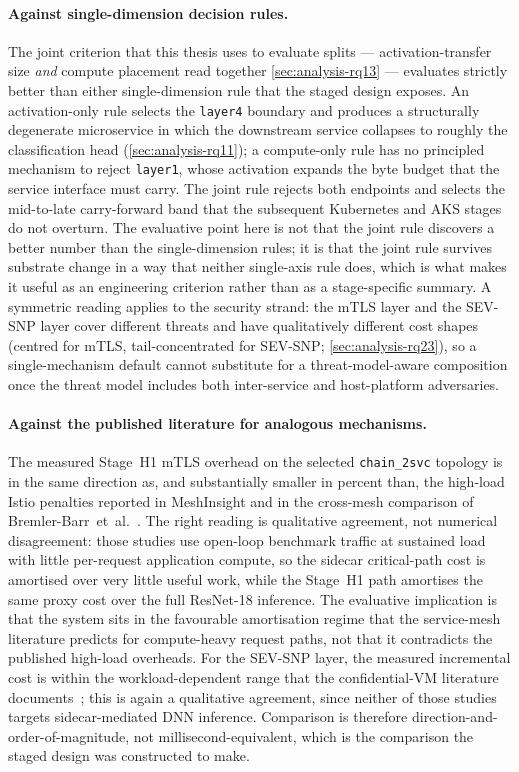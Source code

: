 \paragraph{Against single-dimension decision rules.}
The joint criterion that this thesis uses to evaluate splits ---
activation-transfer size \emph{and} compute placement read together
\cref{sec:analysis-rq13} --- evaluates strictly better than either
single-dimension rule that the staged design exposes. An
activation-only rule selects the \texttt{layer4} boundary and
produces a structurally degenerate microservice in which the
downstream service collapses to roughly the classification head
(\cref{sec:analysis-rq11}); a compute-only rule has no principled
mechanism to reject \texttt{layer1}, whose activation expands the
byte budget that the service interface must carry. The joint rule
rejects both endpoints and selects the mid-to-late carry-forward
band that the subsequent Kubernetes and AKS stages do not overturn.
The evaluative point here is not that the joint rule discovers a
better number than the single-dimension rules; it is that the joint
rule survives substrate change in a way that neither single-axis
rule does, which is what makes it useful as an engineering criterion
rather than as a stage-specific summary. A symmetric reading applies
to the security strand: the mTLS layer and the SEV-SNP layer cover
different threats and have qualitatively different cost shapes
(centred for mTLS, tail-concentrated for SEV-SNP;
\cref{sec:analysis-rq23}), so a single-mechanism default cannot
substitute for a threat-model-aware composition once the threat
model includes both inter-service and host-platform adversaries.

\paragraph{Against the published literature for analogous mechanisms.}
The measured Stage~H1 mTLS overhead on the selected
\texttt{chain\_2svc} topology is in the same direction as, and
substantially smaller in percent than, the high-load Istio penalties
reported in MeshInsight and in the cross-mesh comparison of
Bremler-Barr~et~al.~\cite{meshinsight_socc23,bremlerbarr2025mtls}.
The right reading is qualitative agreement, not numerical
disagreement: those studies use open-loop benchmark traffic at
sustained load with little per-request application compute, so the
sidecar critical-path cost is amortised over very little useful work,
while the Stage~H1 path amortises the same proxy cost over the full
ResNet-18 inference. The evaluative implication is that the system
sits in the favourable amortisation regime that the service-mesh
literature predicts for compute-heavy request paths, not that it
contradicts the published high-load overheads. For the SEV-SNP layer,
the measured incremental cost is within the workload-dependent range
that the confidential-VM literature
documents~\cite{misono2024_cvm_explained,akram2021_hpc_tees}; this is
again a qualitative agreement, since neither of those studies targets
sidecar-mediated DNN inference. Comparison is therefore
direction-and-order-of-magnitude, not millisecond-equivalent, which
is the comparison the staged design was constructed to make.

